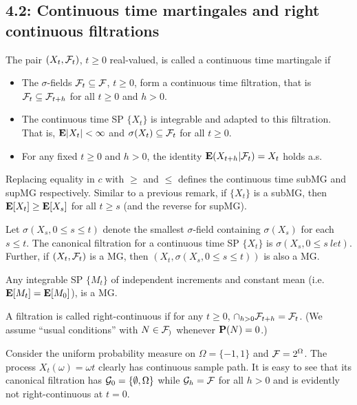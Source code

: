 \subsection*{4.2: Continuous time martingales and right continuous filtrations}
\begin{definition*} 
The pair $(X_t, \mathcal{F}_t)$, $t \ge 0$ real-valued, is called a continuous time
martingale if
\begin{itemize}
\item The $\sigma$-fields $\mathcal{F}_t \subseteq \mathcal{F}$, $t \ge 0$, form a continuous time
filtration, that is $\mathcal{F}_t \subseteq \mathcal{F}_{t+h}$ for all $t \ge 0$ and $h > 0$.

\item The continuous time SP $\{X_t\}$ is integrable and adapted to this
filtration. That is, $\mathbf{E}|X_t| < \infty$ and $\sigma(X_t) \subseteq \mathcal{F}_t$ for all
$t \ge 0$.

\item For any fixed $t \ge 0$ and $h > 0$, the identity $\mathbf{E}(X_{t+h} | \mathcal{F}_t) =
X_t$ holds a.s.
\end{itemize}
Replacing equality in $c$ with $\ge$ and $\le$ defines the continuous time subMG
and supMG respectively. Similar to a previous remark, if $\{X_t\}$ is a subMG,
then $\mathbf{E}[X_t] \ge \mathbf{E}[X_s]$ for all $t \ge s$ (and the reverse for supMG).
\end{definition*} 

\begin{remark*} 
Let $\sigma(X_s, 0 \le s \le t)$ denote the smallest $\sigma$-field containing
$\sigma(X_s)$ for each $s \le t$. The canonical filtration for a continuous time
SP $\{X_t\}$ is $\sigma(X_s, 0 \le s\ le t)$. Further, if $(X_t, \mathcal{F}_t)$ is a MG,
then $(X_t, \sigma(X_s, 0 \le s \le t))$ is also a MG.
\end{remark*} 

\begin{proposition*} 
Any integrable SP $\{M_t\}$ of independent increments and constant mean (i.e.
$\mathbf{E}[M_t] = \mathbf{E}[M_0]$), is a MG.
\end{proposition*} 

\begin{definition*} 
A filtration is called right-continuous if for any $t \ge 0$, $\cap_{h > 0}
\mathcal{F}_{t + h} = \mathcal{F}_t$. (We assume ``usual conditions'' with $N \in \mathcal{F}_)$ whenever
$\mathbf{P}(N) = 0$.)
\end{definition*} 

\begin{example*} 
Consider the uniform probability measure on $\Omega = \{-1, 1\}$ and $\mathcal{F} =
2^\Omega$. The process $X_t(\omega) = \omega t$ clearly has continuous sample
path. It is easy to see that its canonical filtration has $\mathcal{G}_0 = \{\emptyset,
\Omega\}$ while $\mathcal{G}_h = \mathcal{F}$ for all $h > 0$ and is evidently not
right-continuous at $t = 0$.
\end{example*} 

